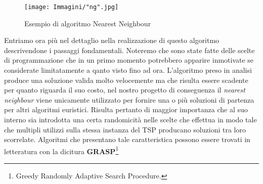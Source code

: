\documentclass[11pt]{article}
\begin{document}
\begin{figure}[htbp]
    \centering
    \texttt{[image: Immagini/"ng".jpg]}
    \caption{Esempio di algoritmo Nearest Neighbour}
\end{figure}

Entriamo ora più nel dettaglio nella realizzazione di questo algoritmo descrivendone i passaggi fondamentali. Noteremo che sono state fatte delle scelte di programmazione che in un primo momento potrebbero apparire inmotivate se considerate limitatamente a qanto visto fino ad ora.
L'algoritmo preso in analisi produce una soluzione valida molto velocemente ma che risulta essere scadente per quanto riguarda il suo costo, nel nostro progetto di conseguenza il \textit{nearest neighbour} viene unicamente utilizzato per fornire una o più soluzioni di partenza per altri algoritmi euristici. Risulta pertanto di maggior importanza che al suo interno sia introdotta una certa randomicità nelle scelte che effettua in modo tale che multipli utilizzi sulla stessa instanza del TSP producano soluzioni tra loro scorrelate. Algoritmi che presentano tale caratteristica possono essere trovati in letteratura con la dicitura \textbf{GRASP}\footnote{Greedy Randomly Adaptive Search Procedure.}
\end{document}
